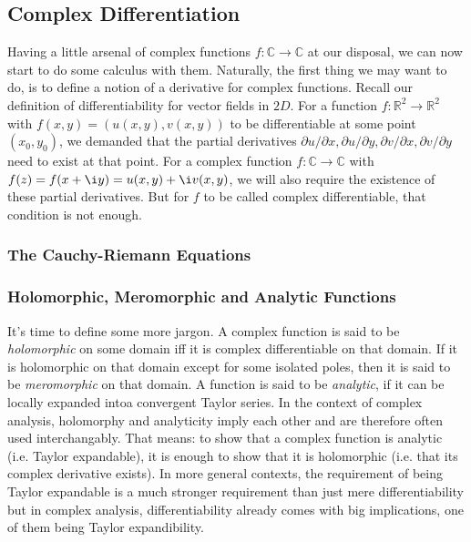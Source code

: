 \subsection{Complex Differentiation}
Having a little arsenal of complex functions $f: \mathbb{C} \rightarrow \mathbb{C}$ at our disposal, we can now start to do some calculus with them. Naturally, the first thing we may want to do, is to define a notion of a derivative for complex functions. Recall our definition of differentiability for vector fields in $2D$. For a function $f: \mathbb{R}^2 \rightarrow \mathbb{R}^2$ with $f(x,y) = (u(x,y), v(x,y))$ to be differentiable at some point $(x_0, y_0)$, we demanded that the partial derivatives $\partial u / \partial x, \partial u / \partial y, \partial v / \partial x, \partial v / \partial y$ need to exist at that point. For a complex function $f: \mathbb{C} \rightarrow \mathbb{C}$ with $f(z) = f(x + \i y) = u(x,y) + \i v(x,y)$, we will also require the existence of these partial derivatives. But for $f$ to be called complex differentiable, that condition is not enough.

\subsubsection{The Cauchy-Riemann Equations}


\subsubsection{Holomorphic, Meromorphic and Analytic Functions}
It's time to define some more jargon. A complex function is said to be \emph{holomorphic} on some domain iff it is complex differentiable on that domain. If it is holomorphic on that domain except for some isolated poles, then it is said to be \emph{meromorphic} on that domain. A function is said to be \emph{analytic}, if it can be locally expanded intoa convergent Taylor series. In the context of complex analysis, holomorphy and analyticity imply each other and are therefore often used interchangably. That means: to show that a complex function is analytic (i.e. Taylor expandable), it is enough to show that it is holomorphic (i.e. that its complex derivative exists). In more general contexts, the requirement of being Taylor expandable is a much stronger requirement than just mere differentiability but in complex analysis, differentiability already comes with big implications, one of them being Taylor expandibility.

